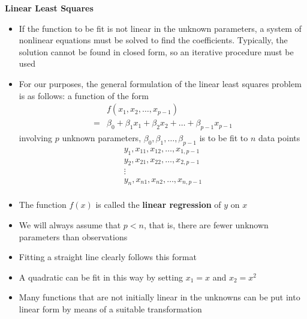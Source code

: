 \documentclass[landscape]{slides}
\newcommand{\heading}[1]{%
  \begin{center}
    \large\bf \color{red}
        #1
  \end{center}
  \vspace{1ex minus 1ex}}
\begin{document}
\begin{slide}
\heading{Linear Least Squares}
\begin{itemize}

\item If the function to be fit is not linear in the unknown parameters, a system
of nonlinear equations must be solved to find the coefficients. Typically, the
solution cannot be found in closed form, so an iterative procedure must be used

\item For our purposes, the general formulation of the linear least squares 
problem is as follows: a function of the form
$$\begin{array}{ll}
&f(x_1,x_2,\ldots,x_{p-1})\\
=&\beta_0+\beta_1x_1+\beta_2x_2+\ldots+\beta_{p-1}x_{p-1}\end{array}$$
involving $p$ unknown parameters, $\beta_0,\beta_1,\ldots,\beta_{p-1}$
is to be fit to $n$ data points
$$\begin{array}{c}
y_1,x_{11},x_{12},\ldots,x_{1,p-1}\\
y_2,x_{21},x_{22},\ldots,x_{2,p-1}\\
\vdots\\
y_n,x_{n1},x_{n2},\ldots,x_{n,p-1}\\
\end{array}$$
%
\item The function $f(x)$ is called the {\bf linear regression} of $y$ on $x$

\item We will always assume that $p<n$, that is, there are fewer unknown 
parameters than observations

\item Fitting a straight line clearly follows this format

\item A quadratic can be fit in this way by setting $x_1=x$ and $x_2=x^2$

\item Many functions that are not initially linear in the unknowns can be put
into linear form by means of a suitable transformation

\end{itemize}
\end{slide}
\end{document}
